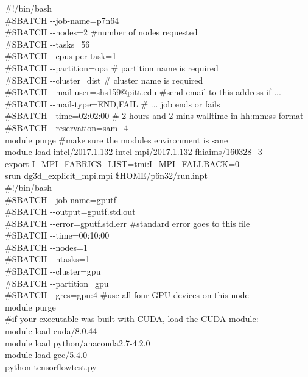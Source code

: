 \documentclass[landscape,a0paper,fontscale=0.285]{baposter} %
\begin{document}
\begin{poster}
{\colorbox[HTML]{cdb87d}{}
\#!/bin/bash\\
\#SBATCH -{}-job-name=p7n64\\
\#SBATCH -{}-nodes=2 \hfill\#number of nodes requested\\
\#SBATCH -{}-tasks=56\\
\#SBATCH -{}-cpus-per-task=1\\
\#SBATCH -{}-partition=opa \hfill\# partition name is required \\
\#SBATCH -{}-cluster=dist \hfill\# cluster name is required \\
\#SBATCH -{}-mail-user=shs159@pitt.edu \hfill\#send email to this address if ...\\
\#SBATCH -{}-mail-type=END,FAIL \hfill\# ... job ends or fails\\
\#SBATCH -{}-time=02:02:00 \hfill\# 2 hours and 2 mins walltime in hh:mm:ss format\\
\#SBATCH -{}-reservation=sam\_4\\
module purge \hfill\#make sure the modules environment is sane \\
module load intel/2017.1.132 intel-mpi/2017.1.132 fhiaims/160328\_3\\
export I\_MPI\_FABRICS\_LIST=tmi:I\_MPI\_FALLBACK=0\\
srun dg3d\_explicit\_mpi.mpi \$HOME/p6n32/run.inpt\\

\colorbox[HTML]{cdb87d}{}
\#!/bin/bash \\
\#SBATCH -{}-job-name=gputf\\
\#SBATCH -{}-output=gputf.std.out\\
\#SBATCH -{}-error=gputf.std.err \hfill\#standard error goes to this file\\
\#SBATCH -{}-time=00:10:00\\
\#SBATCH -{}-nodes=1\\
\#SBATCH -{}-ntasks=1\\
\#SBATCH -{}-cluster=gpu\\             
\#SBATCH -{}-partition=gpu\\             
\#SBATCH -{}-gres=gpu:4 \hfill\#use all four GPU devices on this node\\
module purge\\
\#if your executable was built with CUDA, load the CUDA module:\\
module load cuda/8.0.44\\
module load python/anaconda2.7-4.2.0\\
module load gcc/5.4.0\\
python tensorflowtest.py
}


\end{poster}
\end{document}
